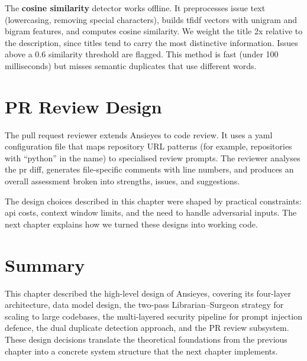 The \textbf{cosine similarity} detector works offline. It preprocesses issue text (lowercasing, removing special characters), builds \gls{tfidf} vectors with unigram and bigram features, and computes cosine similarity. We weight the title 2x relative to the description, since titles tend to carry the most distinctive information. Issues above a 0.6 similarity threshold are flagged. This method is fast (under 100 milliseconds) but misses semantic duplicates that use different words.

\section{PR Review Design}

The pull request reviewer extends Ansieyes to code review. It uses a \gls{yaml} configuration file that maps repository URL patterns (for example, repositories with ``python'' in the name) to specialised review prompts. The reviewer analyses the \gls{pr} diff, generates file-specific comments with line numbers, and produces an overall assessment broken into strengths, issues, and suggestions.

The design choices described in this chapter were shaped by practical constraints: \gls{api} costs, context window limits, and the need to handle adversarial inputs. The next chapter explains how we turned these designs into working code.

\section{Summary}

This chapter described the high-level design of Ansieyes, covering its four-layer architecture, data model design, the two-pass Librarian--Surgeon strategy for scaling to large codebases, the multi-layered security pipeline for prompt injection defence, the dual duplicate detection approach, and the PR review subsystem. These design decisions translate the theoretical foundations from the previous chapter into a concrete system structure that the next chapter implements.
